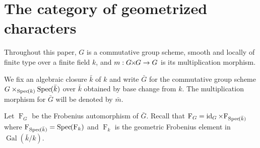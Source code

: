 \documentclass[11pt]{amsart}
\theoremstyle{plain}
\theoremstyle{definition}
\theoremstyle{remark}
\newcommand{\Spec}[1]{{\operatorname{Spec}\hskip-1pt( #1 )}}
\newcommand{\bFq}{\bar{k}}
\newcommand{\Fq}{k}
\DeclareMathOperator{\Gal}{Gal}
\newcommand{\Frob}[1]{{\operatorname{F}_{#1}}}
\DeclareMathOperator{\id}{id}
\newcommand{\bm}{\bar{m}}
\newcommand{\bG}{\bar{G}}
\newcommand{\tight}[3]{\hspace{-#1pt}{#2}\hspace{-#3pt}}
\newcommand{\GxG}{\text{$G \tight{1}{\times}{1} G$}}
\begin{document}
\section{The category of geometrized characters}\label{sec:category}

Throughout this paper, $G$ is a commutative group scheme,
smooth and locally of finite type over a finite field $\Fq$, and $m : \GxG\to G$ is its multiplication morphism.

We fix an algebraic closure $\bFq$ of $\Fq$ and write $\bG$ for the
commutative group scheme $G \times_{\Spec{\Fq}} \Spec{\bFq}$ over $\bFq$ obtained by base change from $k$. The multiplication morphism for $\bG$ will be denoted by $\bm$. 

Let $\Frob{G}$ be the Frobenius automorphism of $\bG$.
Recall that $\Frob{G} = \id_{G}\times \Frob{\Spec{\bFq}}$ where
$\Frob{\Spec{\bFq}} = \Spec{\Frob{\Fq}}$ and $\Frob{\Fq}$  is the geometric Frobenius element in $\Gal(\bFq/\Fq)$.
\end{document}
